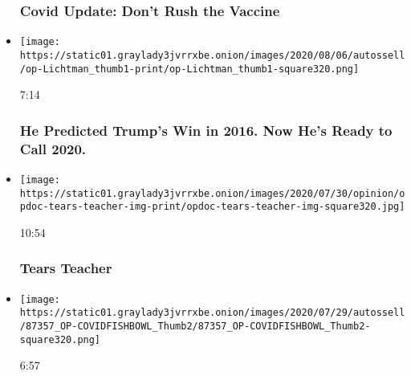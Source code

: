\begin{itemize}
  \hypertarget{covid-update-dont-rush-the-vaccine}{%
  \subsubsection{Covid Update: Don't Rush the
  Vaccine}\label{covid-update-dont-rush-the-vaccine}}
\item
  \href{https://www.nytimes3xbfgragh.onion/video/opinion/100000007227782/2020-election-prediction-allan-lichtman.html?action=click\&module=video-series-bar\&region=header\&pgtype=Article\&playlistId=video/opinion}{}

  \texttt{[image: https://static01.graylady3jvrrxbe.onion/images/2020/08/06/autossell/op-Lichtman\_thumb1-print/op-Lichtman\_thumb1-square320.png]}

  7:14

  \hypertarget{he-predicted-trumps-win-in-2016-now-hes-ready-to-call-2020}{%
  \subsubsection{He Predicted Trump's Win in 2016. Now He's Ready to
  Call
  2020.}\label{he-predicted-trumps-win-in-2016-now-hes-ready-to-call-2020}}
\item
  \href{https://www.nytimes3xbfgragh.onion/video/opinion/100000007247238/tears-teacher.html?action=click\&module=video-series-bar\&region=header\&pgtype=Article\&playlistId=video/opinion}{}

  \texttt{[image: https://static01.graylady3jvrrxbe.onion/images/2020/07/30/opinion/opdoc-tears-teacher-img-print/opdoc-tears-teacher-img-square320.jpg]}

  10:54

  \hypertarget{tears-teacher}{%
  \subsubsection{Tears Teacher}\label{tears-teacher}}
\item
  \href{https://www.nytimes3xbfgragh.onion/video/opinion/100000007227777/covid-19-global-response.html?action=click\&module=video-series-bar\&region=header\&pgtype=Article\&playlistId=video/opinion}{}

  \texttt{[image: https://static01.graylady3jvrrxbe.onion/images/2020/07/29/autossell/87357\_OP-COVIDFISHBOWL\_Thumb2/87357\_OP-COVIDFISHBOWL\_Thumb2-square320.png]}

  6:57

  \hypertarget{thats-ridiculous-how-americas-coronavirus-response-looks-abroad}{%
}
\end{itemize}
